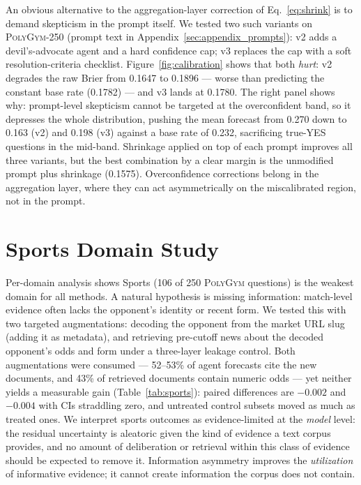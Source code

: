 An obvious alternative to the aggregation-layer correction of Eq.~\eqref{eq:shrink} is to demand skepticism in the prompt itself.
We tested two such variants on \textsc{PolyGym}-250 (prompt text in Appendix~\ref{sec:appendix_prompts}): v2 adds a devil's-advocate agent and a hard confidence cap; v3 replaces the cap with a soft resolution-criteria checklist.
Figure~\ref{fig:calibration} shows that both \emph{hurt}: v2 degrades the raw Brier from 0.1647 to 0.1896 --- worse than predicting the constant base rate (0.1782) --- and v3 lands at 0.1780.
The right panel shows why: prompt-level skepticism cannot be targeted at the overconfident band, so it depresses the whole distribution, pushing the mean forecast from 0.270 down to 0.163 (v2) and 0.198 (v3) against a base rate of 0.232, sacrificing true-YES questions in the mid-band.
Shrinkage applied on top of each prompt improves all three variants, but the best combination by a clear margin is the unmodified prompt plus shrinkage (0.1575).
Overconfidence corrections belong in the aggregation layer, where they can act asymmetrically on the miscalibrated region, not in the prompt.

\section{Sports Domain Study}
\label{sec:sports}



Per-domain analysis shows Sports (106 of 250 \textsc{PolyGym} questions) is the weakest domain for all methods.
A natural hypothesis is missing information: match-level evidence often lacks the opponent's identity or recent form.
We tested this with two targeted augmentations: decoding the opponent from the market URL slug (adding it as metadata), and retrieving pre-cutoff news about the decoded opponent's odds and form under a three-layer leakage control.
Both augmentations were consumed --- 52--53\% of agent forecasts cite the new documents, and 43\% of retrieved documents contain numeric odds --- yet neither yields a measurable gain (Table~\ref{tab:sports}): paired differences are $-0.002$ and $-0.004$ with CIs straddling zero, and untreated control subsets moved as much as treated ones.
We interpret sports outcomes as evidence-limited at the \emph{model} level: the residual uncertainty is aleatoric given the kind of evidence a text corpus provides, and no amount of deliberation or retrieval within this class of evidence should be expected to remove it.
Information asymmetry improves the \emph{utilization} of informative evidence; it cannot create information the corpus does not contain.

